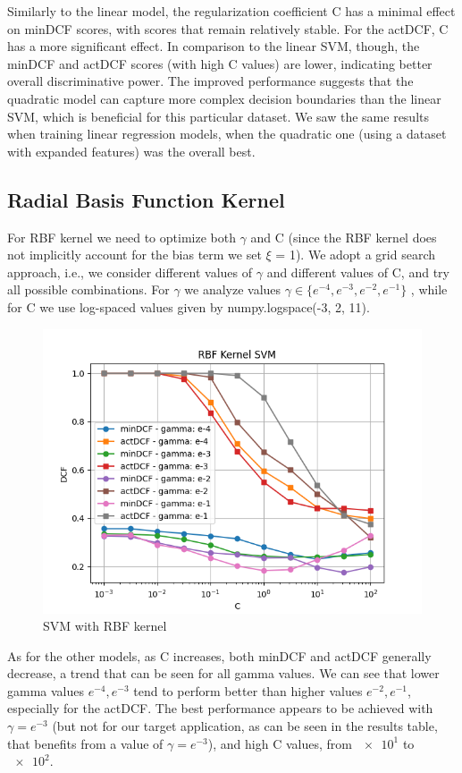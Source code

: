\documentclass[12pt, a4paper]{article}
\begin{document}
Similarly to the linear model, the regularization coefficient C has a minimal effect on minDCF scores, with scores that remain relatively stable. For the actDCF, C has a more significant effect.
In comparison to the linear SVM, though, the minDCF and actDCF scores (with high C values) are lower, indicating better overall discriminative power. The improved performance suggests that the quadratic model can capture more complex decision boundaries than the linear SVM, which is beneficial for this particular dataset. We saw the same results when training linear regression models, when the quadratic one (using a dataset with expanded features) was the overall best.

\subsection{Radial Basis Function Kernel}
For RBF kernel we need to optimize both $\gamma$ and C (since the RBF kernel does not implicitly account for the bias term we set $\xi$ = 1). We adopt a grid search approach, i.e., we consider different values of  $\gamma$ and different values of C, and try all possible combinations. For  $\gamma$ we analyze values $\gamma \in \{e^{-4}, e^{-3}, e^{-2}, e^{-1}\}$ , while for C we use log-spaced values given by numpy.logspace(-3, 2, 11).

\begin{figure}[ht]
	\centering
	\includegraphics[width=.4\textwidth]{project09/svm_rbf_kernel}
	\caption{SVM with RBF kernel}
	\label{fig:SVM_RBF}
\end{figure}

As for the other models, as C increases, both minDCF and actDCF generally decrease, a trend that can be seen for all gamma values. We can see that lower gamma values $e^{-4}, e^{-3}$ tend to perform better than higher values $e^{-2}, e^{-1}$, especially for the actDCF. The best performance appears to be achieved with $\gamma = e^{-3}$ (but not for our target application, as can be seen in the results table, that benefits from a value of $\gamma = e^{-3}$), and high C values, from $\num{e1}$ to $\num{e2}$.
\end{document}
